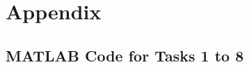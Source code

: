 \renewcommand{\thesubsection}{\thesection.\arabic{subsection}}
\appendix
\section{Appendix}

\subsection{MATLAB Code for Tasks 1 to 8 }
\label{apdx:matlab}
\begin{center}
	
\end{center}
